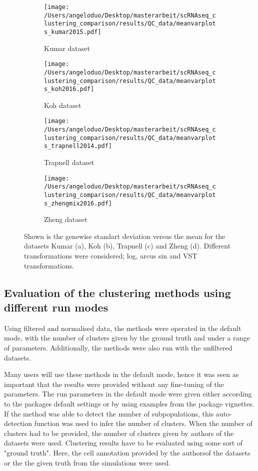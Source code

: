 \documentclass[12pt, a4paper]{article}\usepackage[]{graphicx}\usepackage[]{color}
\begin{document}
\begin{figure}[H]
\centering
\begin{subfigure}{.5\textwidth}
  \centering
  \texttt{[image: /Users/angeloduo/Desktop/masterarbeit/scRNAseq\_clustering\_comparison/results/QC\_data/meanvarplots\_kumar2015.pdf]}
  \caption{Kumar dataset}
  \label{fig:transsim}
\end{subfigure}%
\begin{subfigure}{.5\textwidth}
  \centering
  \texttt{[image: /Users/angeloduo/Desktop/masterarbeit/scRNAseq\_clustering\_comparison/results/QC\_data/meanvarplots\_koh2016.pdf]}
  \caption{Koh dataset}
  \label{fig:transkoh}
\end{subfigure}
\begin{subfigure}{.5\textwidth}
  \centering
  \texttt{[image: /Users/angeloduo/Desktop/masterarbeit/scRNAseq\_clustering\_comparison/results/QC\_data/meanvarplots\_trapnell2014.pdf]}
  \caption{Trapnell dataset}
  \label{fig:transtrapnell}
\end{subfigure}%
\begin{subfigure}{.5\textwidth}
  \centering
  \texttt{[image: /Users/angeloduo/Desktop/masterarbeit/scRNAseq\_clustering\_comparison/results/QC\_data/meanvarplots\_zhengmix2016.pdf]}
  \caption{Zheng dataset}
  \label{fig:transzheng}
\end{subfigure}
\caption{Shown is the genewise standart deviation versus the mean for the datasets Kumar (a), Koh (b), Trapnell (c) and Zheng (d). Different transformations were considered; log, arcus sin and VST transformations. }
\label{fig:trans}
\end{figure}

\subsection{Evaluation of the clustering methods using different run modes}
Using filtered and normalised data, the methods were operated in the default mode, with the number of clusters given by the ground truth and under a range of parameters. Additionally, the methods were also run with the unfiltered datasets. 

Many users will use these methods in the default mode, hence it was seen as important that the results were provided without any fine-tuning of the parameters.
The run parameters in the default mode were given either according to the packages default settings or by using examples from the package vignettes. If the method was able to detect the number of subpopulations, this auto-detection function was used to infer the number of clusters. When the number of clusters had to be provided, the number of clusters given by  authors of the datasets were used. Clustering results have to be evaluated using some sort of "ground truth". Here, the cell annotation provided by the authorsof the datasets or the the given truth from the simulations were used.
\end{document}
